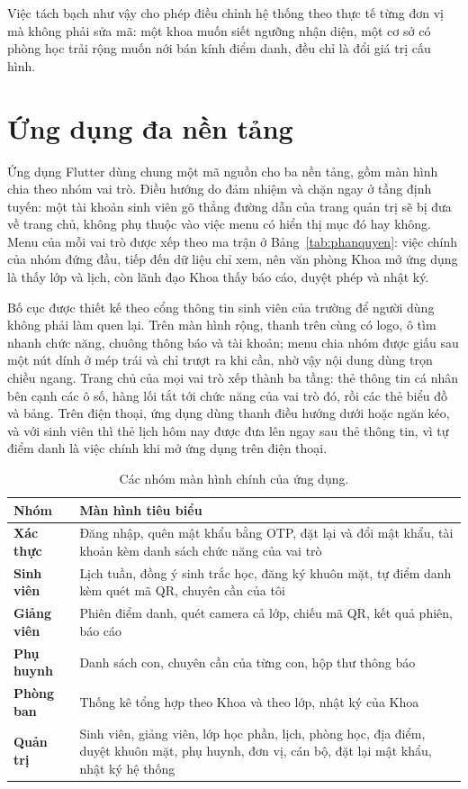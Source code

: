 Việc tách bạch như vậy cho phép điều chỉnh hệ thống theo thực tế từng đơn vị
mà không phải sửa mã: một khoa muốn siết ngưỡng nhận diện, một cơ sở có phòng
học trải rộng muốn nới bán kính điểm danh, đều chỉ là đổi giá trị cấu hình.

\section{Ứng dụng đa nền tảng}

Ứng dụng Flutter dùng chung một mã nguồn cho ba nền tảng, gồm
\FsoManHinh{} màn hình chia theo \FsoNhomManHinh{} nhóm vai trò. Điều hướng
do  đảm nhiệm và chặn ngay ở tầng định tuyến: một tài khoản
sinh viên gõ thẳng đường dẫn của trang quản trị sẽ bị đưa về trang chủ, không
phụ thuộc vào việc menu có hiển thị mục đó hay không. Menu của mỗi vai trò
được xếp theo ma trận ở Bảng~\ref{tab:phanquyen}: việc chính của nhóm đứng
đầu, tiếp đến dữ liệu chỉ xem, nên văn phòng Khoa mở ứng dụng là thấy lớp và
lịch, còn lãnh đạo Khoa thấy báo cáo, duyệt phép và nhật ký.

Bố cục được thiết kế theo cổng thông tin sinh viên của trường để người dùng
không phải làm quen lại. Trên màn hình rộng, thanh trên cùng có logo, ô tìm
nhanh chức năng, chuông thông báo và tài khoản; menu chia nhóm được giấu sau
một nút dính ở mép trái và chỉ trượt ra khi cần, nhờ vậy nội dung dùng trọn
chiều ngang. Trang chủ của mọi vai trò xếp thành ba tầng: thẻ thông tin cá
nhân bên cạnh các ô số, hàng lối tắt tới chức năng của vai trò đó, rồi các
thẻ biểu đồ và bảng. Trên điện thoại, ứng dụng dùng thanh điều hướng dưới
hoặc ngăn kéo, và với sinh viên thì thẻ lịch hôm nay được đưa lên ngay sau
thẻ thông tin, vì tự điểm danh là việc chính khi mở ứng dụng trên điện thoại.

\begin{table}[H]
\centering
\caption{Các nhóm màn hình chính của ứng dụng.}
\label{tab:manhinh}
\small
\begin{tabularx}{\textwidth}{@{}>{\bfseries}p{3.0cm} X@{}}
\toprule
Nhóm & Màn hình tiêu biểu \\
\midrule
Xác thực & Đăng nhập, quên mật khẩu bằng OTP, đặt lại và đổi mật khẩu, tài
  khoản kèm danh sách chức năng của vai trò \\
Sinh viên & Lịch tuần, đồng ý sinh trắc học, đăng ký khuôn mặt, tự điểm danh
  kèm quét mã QR, chuyên cần của tôi \\
Giảng viên & Phiên điểm danh, quét camera cả lớp, chiếu mã QR, kết quả phiên,
  báo cáo \\
Phụ huynh & Danh sách con, chuyên cần của từng con, hộp thư thông báo \\
Phòng ban & Thống kê tổng hợp theo Khoa và theo lớp, nhật ký của Khoa \\
Quản trị & Sinh viên, giảng viên, lớp học phần, lịch, phòng học, địa điểm,
  duyệt khuôn mặt, phụ huynh, đơn vị, cán bộ, đặt lại mật khẩu, nhật ký hệ
  thống \\
\bottomrule
\end{tabularx}
\end{table}

